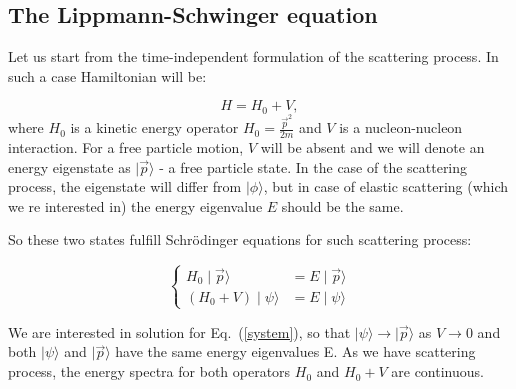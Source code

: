 \subsection{The Lippmann-Schwinger equation}




    Let us start from the time-independent formulation of the scattering process.
    In such a case Hamiltonian will be:

    \begin{equation}
        H = H_0 + V,
    \end{equation}
    where $H_0$ is a kinetic energy operator $H_0 = \frac{\vec{p}^2}{2m}$ 
    and $V$ is a nucleon-nucleon interaction.
    For a free particle motion, $V$ will be absent and we will denote an energy eigenstate as
    $\mid \vec{p} \rangle$ - a free particle state.
    In the case of the scattering process, the eigenstate will differ from $\mid \phi \rangle$,
    but in case of elastic scattering (which we re interested in) the energy eigenvalue $E$ should be the same.

    So these two states fulfill Schr\"{o}dinger equations for such scattering process:

    \begin{equation}
        \begin{cases}
            H_0 \mid \vec{p} \rangle &= E \mid \vec{p} \rangle \\
            (H_0 + V) \mid \psi \rangle &= E \mid \psi \rangle
        \end{cases}
        \label{system}
    \end{equation}

    We are interested in solution for Eq.~(\ref{system}), so that 
    $\mid \psi \rangle \rightarrow \mid \vec{p} \rangle$ as $V \rightarrow 0$
    and both $\mid \psi \rangle$ and $\mid \vec{p} \rangle$ have the same energy eigenvalues E.
    As we have scattering process, the energy spectra for both operators $H_0$ and $H_0 + V$
    are continuous. 

